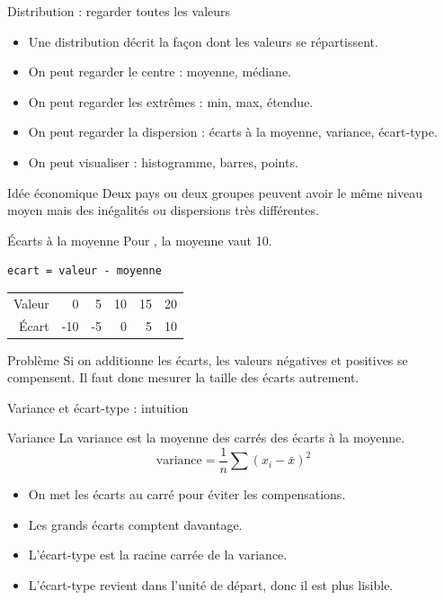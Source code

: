 \documentclass[10pt,aspectratio=169]{beamer}
\begin{document}
\begin{frame}{Distribution : regarder toutes les valeurs}
\begin{itemize}
  \item Une distribution décrit la façon dont les valeurs se répartissent.
  \item On peut regarder le centre : moyenne, médiane.
  \item On peut regarder les extrêmes : min, max, étendue.
  \item On peut regarder la dispersion : écarts à la moyenne, variance, écart-type.
  \item On peut visualiser : histogramme, barres, points.
\end{itemize}
\begin{block}{Idée économique}
Deux pays ou deux groupes peuvent avoir le même niveau moyen mais des inégalités ou dispersions très différentes.
\end{block}
\end{frame}

\begin{frame}[fragile]{Écarts à la moyenne}
Pour , la moyenne vaut 10.
\begin{lstlisting}
ecart = valeur - moyenne
\end{lstlisting}
\begin{tabular}{@{}rrrrrr@{}}
\toprule
Valeur & 0 & 5 & 10 & 15 & 20 \\
Écart & -10 & -5 & 0 & 5 & 10 \\
\bottomrule
\end{tabular}
\vspace{0.45cm}
\begin{block}{Problème}
Si on additionne les écarts, les valeurs négatives et positives se compensent. Il faut donc mesurer la taille des écarts autrement.
\end{block}
\end{frame}

\begin{frame}{Variance et écart-type : intuition}
\begin{block}{Variance}
La variance est la moyenne des carrés des écarts à la moyenne.
\[
\text{variance} = \frac{1}{n}\sum (x_i - \bar{x})^2
\]
\end{block}
\begin{itemize}
  \item On met les écarts au carré pour éviter les compensations.
  \item Les grands écarts comptent davantage.
  \item L'écart-type est la racine carrée de la variance.
  \item L'écart-type revient dans l'unité de départ, donc il est plus lisible.
\end{itemize}
\end{frame}
\end{document}
